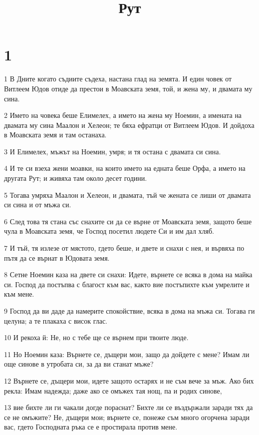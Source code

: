 

\title{Рут}


\chapter{1}

\par 1 В Дните когато съдиите съдеха, настана глад на земята. И един човек от Витлеем Юдов отиде да престои в Моавската земя, той, и жена му, и двамата му сина.
\par 2 Името на човека беше Елимелех, а името на жена му Ноемин, а имената на двамата му сина Маалон и Хелеон; те бяха ефратци от Витлеем Юдов. И дойдоха в Моавската земя и там останаха.
\par 3 И Елимелех, мъжът на Ноемин, умря; и тя остана с двамата си сина.
\par 4 И те си взеха жени моавки, на които името на едната беше Орфа, а името на другата Рут; и живяха там около десет години.
\par 5 Тогава умряха Маалон и Хелеон, и двамата, тъй че жената се лиши от двамата си сина и от мъжа си.
\par 6 След това тя стана със снахите си да се върне от Моавската земя, защото беше чула в Моавската земя, че Господ посетил людете Си и им дал хляб.
\par 7 И тъй, тя излезе от мястото, гдето беше, и двете и снахи с нея, и вървяха по пътя да се върнат в Юдовата земя.
\par 8 Сетне Ноемин каза на двете си снахи: Идете, върнете се всяка в дома на майка си. Господ да постъпва с благост към вас, както вие постъпихте към умрелите и към мене.
\par 9 Господ да ви даде да намерите спокойствие, всяка в дома на мъжа си. Тогава ги целуна; а те плакаха с висок глас.
\par 10 И рекоха й: Не, но с тебе ще се върнем при твоите люде.
\par 11 Но Ноемин каза: Върнете се, дъщери мои, защо да дойдете с мене? Имам ли още синове в утробата си, за да ви станат мъже?
\par 12 Върнете се, дъщери мои, идете защото остарях и не съм вече за мъж. Ако бих рекла: Имам надежда; даже ако се омъжех тая нощ, па и родих синове,
\par 13 вие бихте ли ги чакали догде пораснат? Бихте ли се въздържали заради тях да се не омъжите? Не, дъщери мои; върнете се, понеже съм много огорчена заради вас, гдето Господната ръка се е простирала против мене.
